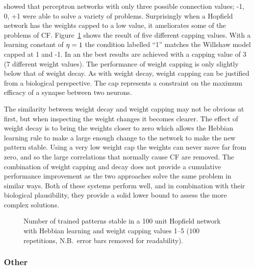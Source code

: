 \citet{Willshaw1969} showed that perceptron networks with only three possible connection values; -1, 0, +1 were able to solve a variety of problems. Surprisingly when a Hopfield network has the weights capped to a low value, it ameliorates some of the problems of CF. Figure~\ref{fig:WeightCap100num} shows the result of five different capping values.  With a learning constant of $\eta = 1$ the condition labelled ``1'' matches the Willshaw model capped at 1 and -1.  In an  the best results are achieved with a capping value of $3$ (7 different weight values).  The performance of weight capping is only slightly below that of weight decay.  As with weight decay, weight capping can be justified from a biological perspective.  The cap represents a constraint on the maximum efficacy of a synapse between two neurons.

The similarity between weight decay and weight capping may not be obvious at first, but when inspecting the weight changes it becomes clearer.  The effect of weight decay is to bring the weights closer to zero which allows the Hebbian learning rule to make a large enough change to the network to make the new pattern stable.  Using a very low weight cap the weights can never move far from zero, and so the large correlations that normally cause CF are removed.  The combination of weight capping and decay does not provide a cumulative performance improvement as the two approaches solve the same problem in similar ways. Both of these systems perform well, and in combination with their biological plausibility, they provide a solid lower bound to assess the more complex solutions.  

\begin{figure}[tbp]
\small
\center
	\caption{Number of trained patterns stable in a 100 unit Hopfield network  with Hebbian learning and weight capping values 1--5 ($100$ repetitions, N.B.\ error bars removed for readability).}
	\label{fig:WeightCap100num}
\end{figure}

\subsubsection{Other}

